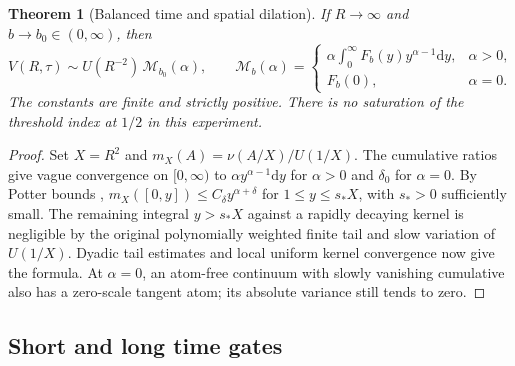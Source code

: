 \documentclass[11pt]{article}
\newtheorem{theorem}{Theorem}[section]
\theoremstyle{remark}
\newcommand{\dd}{\mathrm d}
\begin{document}
\begin{theorem}[Balanced time and spatial dilation]
\label{thm:balanced}
If \(R\to\infty\) and \(b\to b_0\in(0,\infty)\), then
\[
 V(R,\tau)\sim U(R^{-2})\,\mathcal M_{b_0}(\alpha),\qquad
 \mathcal M_b(\alpha)=
 \begin{cases}
 \displaystyle\alpha\int_0^\infty F_b(y)y^{\alpha-1}\dd y,
             &\alpha>0,\\[2pt]
 F_b(0),&\alpha=0.
 \end{cases}
\]
The constants are finite and strictly positive. There is no
saturation of the threshold index at \(1/2\) in this experiment.
\end{theorem}

\begin{proof}
Set \(X=R^2\) and \(m_X(A)=\nu(A/X)/U(1/X)\).
The cumulative ratios give vague convergence on \([0,\infty)\)
to \(\alpha y^{\alpha-1}\dd y\) for \(\alpha>0\) and
\(\delta_0\) for \(\alpha=0\).
By Potter bounds \cite[Thm.~1.5.6]{BGT},
\(m_X([0,y])\le C_\delta y^{\alpha+\delta}\) for
\(1\le y\le s_* X\), with \(s_*>0\) sufficiently small.
The remaining integral \(y>s_*X\) against a rapidly decaying
kernel is negligible by the original polynomially weighted
finite tail and slow variation of \(U(1/X)\).
Dyadic tail estimates and local uniform kernel convergence
now give the formula. At \(\alpha=0\), an atom-free continuum
with slowly vanishing cumulative also has a zero-scale
tangent atom; its absolute variance still tends to zero.
\end{proof}

\subsection{Short and long time gates}
\end{document}
